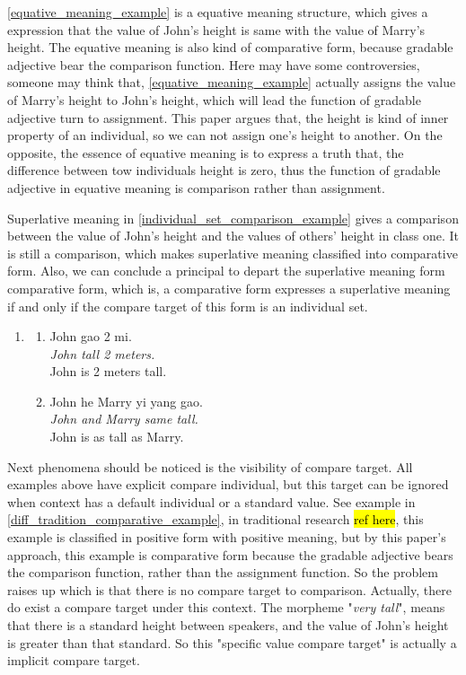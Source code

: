 \documentclass{ctexart}
\begin{document}
\ref{equative_meaning_example} is a equative meaning structure, which gives a expression that the value of John's height is same with the value of Marry's height. The equative meaning is also kind of comparative form, because gradable adjective bear the comparison function. Here may have some controversies, someone may think that, \ref{equative_meaning_example} actually assigns the value of Marry's height to John's height, which will lead the function of gradable adjective turn to assignment. This paper argues that, the height is kind of inner property of an individual, so we can not assign one's height to another. On the opposite, the essence of equative meaning is to express a truth that, the difference between tow individuals height is zero, thus the function of gradable adjective in equative meaning is comparison rather than assignment.

Superlative meaning in \ref{individual_set_comparison_example} gives a comparison between the value of John's height and the values of others' height in class one. It is still a comparison, which makes superlative meaning classified into comparative form. Also, we can conclude a principal to depart the superlative meaning form comparative form, which is, a comparative form expresses a superlative meaning if and only if the compare target of this form is an individual set.

\begin{enumerate}[resume]
    \item
    \begin{enumerate}[ref=(\arabic{enumi}\alph*)]
        \item \label{positive_meaning_example}
        John gao 2 mi.\\
        \textit{John tall 2 meters.} \\
        John is 2 meters tall.

        \item \label{equative_meaning_example}
        John he Marry yi yang gao.\\
        \textit{John and Marry same tall.}\\
        John is as tall as Marry.

    \end{enumerate}
\end{enumerate}

Next phenomena should be noticed is the visibility of compare target. All examples above have explicit compare individual, but this target can be ignored when context has a default individual or a standard value. See example in \ref{diff_tradition_comparative_example}, in traditional research \hl{ref here}, this example is classified in positive form with positive meaning, but by this paper's approach, this example is comparative form because the gradable adjective bears the comparison function, rather than the assignment function. So the problem raises up which is that there is no compare target to comparison. Actually, there do exist a compare target under this context. The morpheme "\textit{very tall}", means that there is a standard height between speakers, and the value of John's height is greater than that standard. So this "specific value compare target" is actually a implicit compare target.
\end{document}
